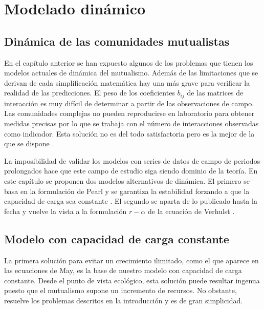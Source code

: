 
\chapter{Modelado dinámico} %

\label{chapterDINAMICA} %


\section{Dinámica de las comunidades mutualistas}

En el capítulo anterior se han expuesto algunos de los problemas que tienen los modelos actuales de dinámica del mutualismo. Además de las limitaciones que se derivan de cada simplificación matemática hay una más grave para verificar la realidad de las predicciones. El peso de los coeficientes $b_{ij}$ de las matrices de interacción es muy difícil de determinar a partir de las observaciones de campo. Las comunidades complejas no pueden reproducirse en laboratorio para obtener medidas precisas por lo que se trabaja con el número de interacciones observadas como indicador. Esta solución no es del todo satisfactoria pero es la mejor de la que se dispone \cite{olesen2002geographic}. 

La imposibilidad de validar los modelos con series de datos de campo de periodos prolongados hace que este campo de estudio siga siendo dominio de la teoría. En este capítulo se proponen dos modelos alternativos de dinámica. El primero se basa en la formulación de Pearl y se garantiza la estabilidad forzando a que la capacidad de carga sea constante \cite{pastor2015simple}. El segundo se aparta de lo publicado hasta la fecha y vuelve la vista a la formulación $r-\alpha$ de la ecuación de Verhulst \cite{garcia2014rethinking}.

\section{Modelo con capacidad de carga constante}

La primera solución para evitar un crecimiento ilimitado, como el que aparece en las ecuaciones de May, es la base de nuestro modelo con capacidad de carga constante. Desde el punto de vista ecológico, esta solución puede resultar ingenua puesto que el mutualismo supone un incremento de recursos. No obstante, resuelve los problemas descritos en la introducción y es de gran simplicidad.

